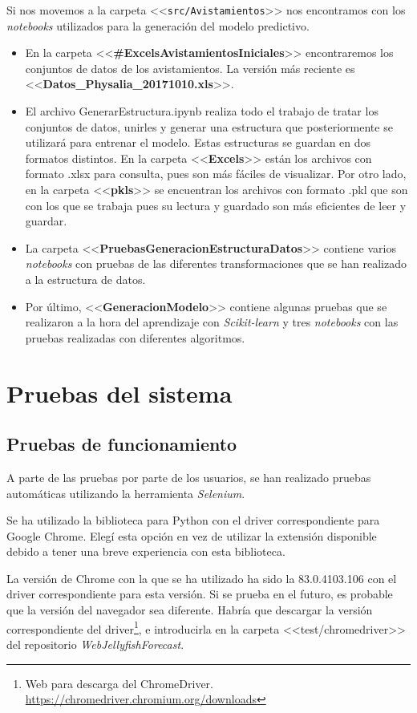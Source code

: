 Si nos movemos a la carpeta <<\texttt{src/Avistamientos}>> nos encontramos con los \emph{notebooks} utilizados para la generación del modelo predictivo.
\begin{itemize}
	\item En la carpeta <<\textbf{\#ExcelsAvistamientosIniciales}>> encontraremos los conjuntos de datos de los avistamientos. La versión más reciente es <<\textbf{Datos\_Physalia\_20171010.xls}>>.
	\item El archivo GenerarEstructura.ipynb realiza todo el trabajo de tratar los conjuntos de datos, unirles y generar una estructura que posteriormente se utilizará para entrenar el modelo. Estas estructuras se guardan en dos formatos distintos. En la carpeta <<\textbf{Excels}>> están los archivos con formato .xlsx para consulta, pues son más fáciles de visualizar. Por otro lado, en la carpeta <<\textbf{pkls}>> se encuentran los archivos con formato .pkl que son con los que se trabaja pues su lectura y guardado son más eficientes de leer y guardar.
	\item La carpeta <<\textbf{PruebasGeneracionEstructuraDatos}>> contiene varios \emph{notebooks} con pruebas de las diferentes transformaciones que se han realizado a la estructura de datos. 
	\item Por último, <<\textbf{GeneracionModelo}>> contiene algunas pruebas que se realizaron a la hora del aprendizaje con \emph{Scikit-learn} y tres \emph{notebooks} con las  pruebas realizadas con diferentes algoritmos.
\end{itemize}

\section{Pruebas del sistema}

\subsection{Pruebas de funcionamiento}
A parte de las pruebas por parte de los usuarios, se han realizado pruebas automáticas utilizando la herramienta \emph{Selenium}.

Se ha utilizado la biblioteca para Python con el driver correspondiente para Google Chrome. Elegí esta opción en vez de utilizar la extensión disponible debido a tener una breve experiencia con esta biblioteca. 

La versión de Chrome con la que se ha utilizado ha sido la 83.0.4103.106 con el driver correspondiente para esta versión. Si se prueba en el futuro, es probable que la versión del navegador sea diferente. Habría que descargar la versión correspondiente del driver\footnote{Web para descarga del ChromeDriver. \url{https://chromedriver.chromium.org/downloads}}, e introducirla en la carpeta <<test/chromedriver>> del repositorio \emph{WebJellyfishForecast}.

